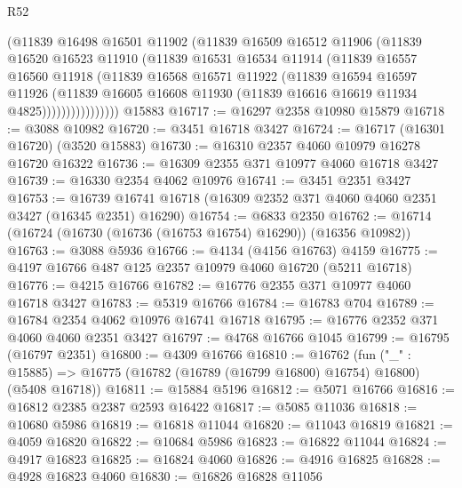 \begin{lexlean}{R52}
\begin{coremodule}
                  (@11839
                    @16498
                    @16501
                    @11902
                    (@11839
                      @16509
                      @16512
                      @11906
                      (@11839
                        @16520
                        @16523
                        @11910
                        (@11839
                          @16531
                          @16534
                          @11914
                          (@11839
                            @16557
                            @16560
                            @11918
                            (@11839
                              @16568
                              @16571
                              @11922
                              (@11839
                                @16594
                                @16597
                                @11926
                                (@11839
                                  @16605
                                  @16608
                                  @11930
                                  (@11839 @16616 @16619 @11934 @4825))))))))))))))))
    @15883
@16717 := @16297 @2358 @10980 @15879
@16718 := @3088 @10982
@16720 := @3451 @16718 @3427
@16724 := @16717 (@16301 @16720) (@3520 @15883)
@16730 := @16310 @2357 @4060 @10979 @16278 @16720 @16322
@16736 := @16309 @2355 @371 @10977 @4060 @16718 @3427
@16739 := @16330 @2354 @4062 @10976
@16741 := @3451 @2351 @3427
@16753 := @16739 @16741 @16718 (@16309 @2352 @371 @4060 @4060 @2351 @3427 (@16345 @2351) @16290)
@16754 := @6833 @2350
@16762 := @16714 (@16724 (@16730 (@16736 (@16753 @16754) @16290)) (@16356 @10982))
@16763 := @3088 @5936
@16766 := @4134 (@4156 @16763) @4159
@16775 := @4197 @16766 @487 @125 @2357 @10979 @4060 @16720 (@5211 @16718)
@16776 := @4215 @16766
@16782 := @16776 @2355 @371 @10977 @4060 @16718 @3427
@16783 := @5319 @16766
@16784 := @16783 @704
@16789 := @16784 @2354 @4062 @10976 @16741 @16718
@16795 := @16776 @2352 @371 @4060 @4060 @2351 @3427
@16797 := @4768 @16766 @1045
@16799 := @16795 (@16797 @2351)
@16800 := @4309 @16766
@16810 := @16762
    (fun ("_" : @15885) => @16775 (@16782 (@16789 (@16799 @16800) @16754) @16800) (@5408 @16718))
@16811 := @15884 @5196
@16812 := @5071 @16766
@16816 := @16812 @2385 @2387 @2593 @16422
@16817 := @5085 @11036
@16818 := @10680 @5986
@16819 := @16818 @11044
@16820 := @11043 @16819
@16821 := @4059 @16820
@16822 := @10684 @5986
@16823 := @16822 @11044
@16824 := @4917 @16823
@16825 := @16824 @4060
@16826 := @4916 @16825
@16828 := @4928 @16823 @4060
@16830 := @16826 @16828 @11056

\end{coremodule}
\end{lexlean}
